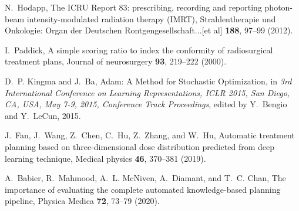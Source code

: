 \documentclass[10pt]{article}
\begin{document}
\begin{thebibliography}{10}
N.~Hodapp,
\newblock The ICRU Report 83: prescribing, recording and reporting photon-beam
  intensity-modulated radiation therapy (IMRT),
\newblock Strahlentherapie und Onkologie: Organ der Deutschen
  Rontgengesellschaft...[et al] {\bf 188}, 97--99 (2012).

I.~Paddick,
\newblock A simple scoring ratio to index the conformity of radiosurgical
  treatment plans,
\newblock Journal of neurosurgery {\bf 93}, 219--222 (2000).

D.~P. Kingma and J.~Ba,
\newblock Adam: {A} Method for Stochastic Optimization,
\newblock in {\em 3rd International Conference on Learning Representations,
  {ICLR} 2015, San Diego, CA, USA, May 7-9, 2015, Conference Track
  Proceedings}, edited by Y.~Bengio and Y.~LeCun, 2015.

J.~Fan, J.~Wang, Z.~Chen, C.~Hu, Z.~Zhang, and W.~Hu,
\newblock Automatic treatment planning based on three-dimensional dose
  distribution predicted from deep learning technique,
\newblock Medical physics {\bf 46}, 370--381 (2019).

A.~Babier, R.~Mahmood, A.~L. McNiven, A.~Diamant, and T.~C. Chan,
\newblock The importance of evaluating the complete automated knowledge-based
  planning pipeline,
\newblock Physica Medica {\bf 72}, 73--79 (2020).

\end{thebibliography}
\end{document}
